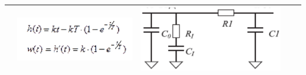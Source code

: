\documentclass[14pt,a4paper,report]{report}
\begin{document}
\begin{table}[h!]
\begin{tabular}{ | m{3cm} | m{3.5cm} | m{4.5cm} | m{2.5cm} | m{2.5cm} }
\begin{minipage}{.3\textwidth}
		\end{minipage}
		&
		\begin{minipage}{.3\textwidth}
			\includegraphics[scale = 0.34]{images/7_4.png}
		\end{minipage}
		&
		\begin{minipage}{.3\textwidth}
			\includegraphics[scale = 0.27]{images/7_5.png}
		\end{minipage} \\ \hline
		

\end{tabular}
\end{table}
\end{document}
